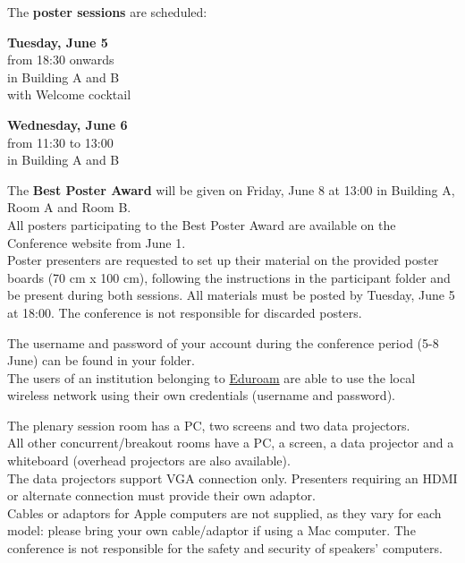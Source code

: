 
\noindent The \textbf{poster sessions} are scheduled:
\begin{center}
  \textbf{Tuesday, June 5} \\
  from 18:30 onwards \\
  in Building A and B\\
  with Welcome cocktail

  \bigskip
   
  \textbf{Wednesday, June 6} \\
  from 11:30 to 13:00 \\
  in Building A and B
\end{center}

\noindent The \textbf{Best Poster Award} will be given on Friday, June 8 at 13:00 in Building A, Room A and Room B.\\

\noindent All posters participating to the Best Poster Award are available on the Conference website from June 1.\\
Poster presenters are requested to set up
their material on the provided poster boards (70 cm x 100 cm), following the instructions in the participant folder and be present during both sessions.  
All materials must be posted by Tuesday, June 5 at 18:00.
The conference is not responsible for discarded posters.


\noindent The username and password of your account during the conference period (5-8 June) can be found in your folder. \\
The users of an institution belonging to \href{https://www.eduroam.org/}{Eduroam} are able to use the local wireless network using their own credentials (username and password).

The plenary session room has a PC, two screens and two data projectors.\\ 
All other concurrent/breakout rooms have a PC, a screen, a data projector and a whiteboard (overhead projectors are also available).\\
The data projectors support VGA connection only. Presenters requiring an HDMI or alternate connection must provide their own adaptor.\\
Cables or adaptors for Apple computers are not supplied, as they vary for each model: please bring your own cable/adaptor if using a Mac computer. 
The conference is not responsible for the safety and security of speakers' computers.

